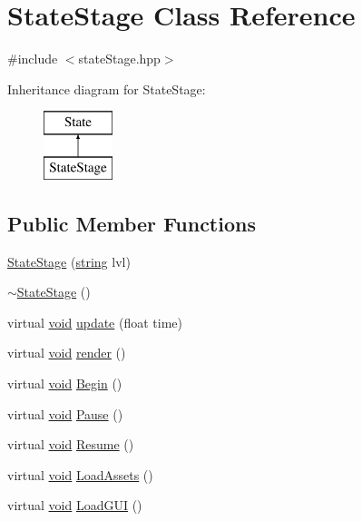 \hypertarget{class_state_stage}{\section{State\-Stage Class Reference}
\label{class_state_stage}
}


{\ttfamily \#include $<$state\-Stage.\-hpp$>$}

Inheritance diagram for State\-Stage\-:\begin{figure}[H]
\begin{center}
\leavevmode
\includegraphics[height=2.000000cm]{class_state_stage}
\end{center}
\end{figure}
\subsection*{Public Member Functions}
\begin{DoxyCompactItemize}
\item 
\hyperlink{class_state_stage_a1c0232e857391295417b6e2ca15a84ca}{State\-Stage} (\hyperlink{_s_d_l__opengl__glext_8h_ae84541b4f3d8e1ea24ec0f466a8c568b}{string} lvl)
\item 
\hyperlink{class_state_stage_a19b9b4c4469e82064015adc4157b855f}{$\sim$\-State\-Stage} ()
\item 
virtual \hyperlink{_s_d_l__opengles2__gl2ext_8h_ae5d8fa23ad07c48bb609509eae494c95}{void} \hyperlink{class_state_stage_a80984c55012d74f3eb0b0318d8f6511a}{update} (float time)
\item 
virtual \hyperlink{_s_d_l__opengles2__gl2ext_8h_ae5d8fa23ad07c48bb609509eae494c95}{void} \hyperlink{class_state_stage_a4dac7e9dbec93f8d5ecfa1088796590c}{render} ()
\item 
virtual \hyperlink{_s_d_l__opengles2__gl2ext_8h_ae5d8fa23ad07c48bb609509eae494c95}{void} \hyperlink{class_state_stage_a544c8819debc2743421875dc31b3f86f}{Begin} ()
\item 
virtual \hyperlink{_s_d_l__opengles2__gl2ext_8h_ae5d8fa23ad07c48bb609509eae494c95}{void} \hyperlink{class_state_stage_a34ce42b989207bc65e7d8edbd86a8fb6}{Pause} ()
\item 
virtual \hyperlink{_s_d_l__opengles2__gl2ext_8h_ae5d8fa23ad07c48bb609509eae494c95}{void} \hyperlink{class_state_stage_ae396effb4e08200f70f4901f1b204b58}{Resume} ()
\item 
virtual \hyperlink{_s_d_l__opengles2__gl2ext_8h_ae5d8fa23ad07c48bb609509eae494c95}{void} \hyperlink{class_state_stage_ae0fc7ce84564739a118facc3337d035f}{Load\-Assets} ()
\item 
virtual \hyperlink{_s_d_l__opengles2__gl2ext_8h_ae5d8fa23ad07c48bb609509eae494c95}{void} \hyperlink{class_state_stage_a21efc84369e3a1f378ce56187fd63691}{Load\-G\-U\-I} ()
\end{DoxyCompactItemize}
